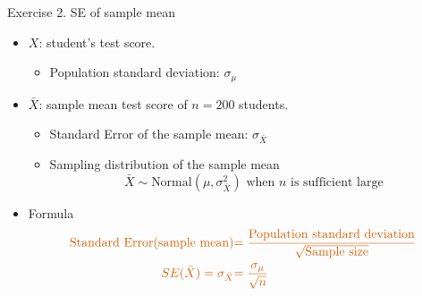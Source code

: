 \documentclass[
  10pt,
  ignorenonframetext,
]{beamer}
\providecommand{\tightlist}{%
  \setlength{\itemsep}{0pt}\setlength{\parskip}{0pt}}
\begin{document}
\begin{frame}{Exercise 2. SE of sample mean}
\protect\hypertarget{exercise-2.-se-of-sample-mean}{}
\begin{itemize}
\tightlist
\item
  \(X\): student's test score.

  \begin{itemize}
  \tightlist
  \item
    Population standard deviation: \(\sigma_\mu\)
  \end{itemize}
\end{itemize}

\vspace{2mm}

\begin{itemize}
\tightlist
\item
  \(\bar{X}\): sample mean test score of \(n = 200\) students.

  \begin{itemize}
  \tightlist
  \item
    Standard Error of the sample mean: \(\sigma_{\bar{X}}\) \vspace{1mm}
  \item
    Sampling distribution of the sample mean \[
    \bar{X} \sim \text{Normal}(\mu,\sigma_{\bar{X}}^2) \text{ when } n \text{ is sufficient large} 
    \]
  \end{itemize}
\end{itemize}

\vspace{2mm}

\begin{itemize}
\tightlist
\item
  Formula \[
  \begin{aligned}
  \color{red}{\text{Standard Error}(\text{sample mean})} &\color{red}{=\frac{\text{Population standard deviation}}{\sqrt{\text{Sample size}}}}\\
  \color{red}{SE(\bar{X}) = \sigma_{\bar{X}}} &\color{red}{= \frac{\sigma_\mu}{\sqrt{n}}}
  \end{aligned}
  \]
\end{itemize}
\end{frame}
\end{document}
